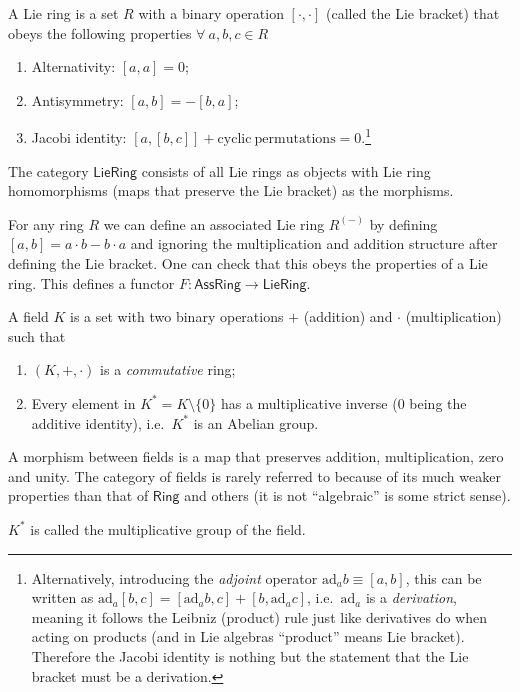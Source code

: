 \documentclass[english,letterpaper]{article}%
\numberwithin{equation}{section}
\numberwithin{figure}{section}
\numberwithin{table}{section}
\theoremstyle{definition}
\theoremstyle{definition}
\theoremstyle{definition}
\theoremstyle{plain}
\theoremstyle{plain}
\theoremstyle{plain}
\theoremstyle{plain}
\theoremstyle{remark}
\theoremstyle{remark}
\begin{document}
\begin{defn}
A Lie ring is a set $R$ with a binary operation $[\cdot,\cdot]$
(called the \textsf{Lie bracket}) that obeys the following properties
$\forall~a,b,c\in R$ 
\begin{enumerate}
\item Alternativity: $[a,a]=0$;
\item Antisymmetry: $[a,b]=-[b,a]$; 
\item Jacobi identity: $[a,[b,c]]+\mathrm{cyclic~permutations}=0$.\footnote{Alternatively, introducing the \emph{adjoint} operator $\mathrm{ad}_{a}b\equiv\left[a,b\right]$,
this can be written as $\mathrm{ad}_{a}\left[b,c\right]=\left[\mathrm{ad}_{a}b,c\right]+\left[b,\mathrm{ad}_{a}c\right]$,
i.e.\ $\mathrm{ad}_{a}$ is a \emph{derivation}, meaning
it follows the Leibniz (product) rule just like derivatives do when
acting on products (and in Lie algebras ``product'' means Lie bracket).
Therefore the Jacobi identity is nothing but the statement that the
Lie bracket must be a derivation.}
\end{enumerate}
The category $\mathsf{LieRing}$ consists of all Lie rings as objects
with Lie ring homomorphisms (maps that preserve the Lie bracket) as
the morphisms.

\end{defn}
\begin{example}
For any ring $R$ we can define an associated Lie ring $R^{(-)}$
by defining $[a,b]=a\cdot b-b\cdot a$ and ignoring the multiplication
and addition structure after defining the Lie bracket. One can check
that this obeys the properties of a Lie ring. This defines a functor
$F:\mathsf{AssRing}\rightarrow\mathsf{LieRing}$.
\end{example}
\begin{defn}[Fields]
A field $K$ is a set with two binary operations $+$ (addition)
and $\cdot$ (multiplication) such that
\begin{enumerate}
\item $(K,+,\cdot)$ is a \emph{commutative} ring;
\item Every element in $K^{\ast}=K\setminus\{0\}$ has a multiplicative
inverse ($0$ being the additive identity), i.e.\ $K^{\ast}$ is an
Abelian group.
\end{enumerate}
A morphism between fields is a map that preserves addition, multiplication,
zero and unity. The category of fields is rarely referred to because
of its much weaker properties than that of $\mathsf{Ring}$ and others
(it is not ``algebraic'' is some strict sense).

$K^{\ast}$ is called the multiplicative group of the field. 
\end{defn}
\end{document}
